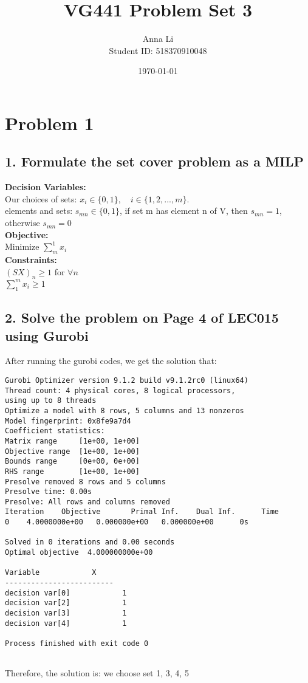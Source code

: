 \documentclass[a4paper,12pt]{journal}
\title{VG441 Problem Set 3}
\author{Anna Li \\Student ID: 518370910048}
\date{\today}
\begin{document}
	\maketitle
	\section*{Problem 1}
	\subsection*{1. Formulate the set cover problem as a MILP}
	\textbf{Decision Variables:}\\
	Our choices of sets: $x_i\in \{0,1\},\quad i\in\{1,2,...,m\}$.\\
	elements and sets: $s_{mn}\in\{0,1\}$, if set m has element n of V, then $s_{mn}=1$, otherwise $s_{mn}=0$\\
	\textbf{Objective:}\\
	Minimize $\sum_{m}^{1}x_i$\\
	\textbf{Constraints:}\\
	$(SX)_{n}\geq 1$ for $\forall n$\\
	$\sum_{1}^{m}x_i\geq 1$
	\subsection*{2. Solve the problem on Page 4 of LEC015 using Gurobi}
	After running the gurobi codes, we get the solution that:
	\begin{lstlisting}
Gurobi Optimizer version 9.1.2 build v9.1.2rc0 (linux64)
Thread count: 4 physical cores, 8 logical processors, 
using up to 8 threads
Optimize a model with 8 rows, 5 columns and 13 nonzeros
Model fingerprint: 0x8fe9a7d4
Coefficient statistics:
Matrix range     [1e+00, 1e+00]
Objective range  [1e+00, 1e+00]
Bounds range     [0e+00, 0e+00]
RHS range        [1e+00, 1e+00]
Presolve removed 8 rows and 5 columns
Presolve time: 0.00s
Presolve: All rows and columns removed
Iteration    Objective       Primal Inf.    Dual Inf.      Time
0    4.0000000e+00   0.000000e+00   0.000000e+00      0s

Solved in 0 iterations and 0.00 seconds
Optimal objective  4.000000000e+00

Variable            X 
-------------------------
decision var[0]            1 
decision var[2]            1 
decision var[3]            1 
decision var[4]            1 

Process finished with exit code 0
	
	\end{lstlisting}
Therefore, the solution is:
we choose set 1, 3, 4, 5
\end{document}
